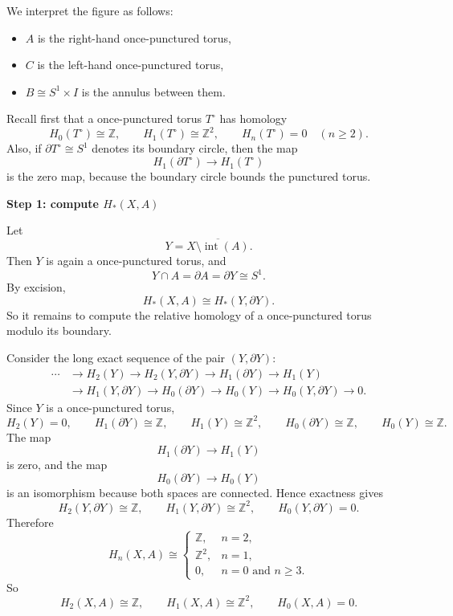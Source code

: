 \begin{solution}
We interpret the figure as follows:

\begin{itemize}
	\item \(A\) is the right-hand once-punctured torus,
	\item \(C\) is the left-hand once-punctured torus,
	\item \(B\cong S^1\times I\) is the annulus between them.
\end{itemize}

Recall first that a once-punctured torus \(T^\circ\) has homology
\[
H_0(T^\circ)\cong \mathbb Z,\qquad
H_1(T^\circ)\cong \mathbb Z^2,\qquad
H_n(T^\circ)=0\quad(n\ge 2).
\]
Also, if \(\partial T^\circ\cong S^1\) denotes its boundary circle, then the map
\[
H_1(\partial T^\circ)\to H_1(T^\circ)
\]
is the zero map, because the boundary circle bounds the punctured torus.


\medskip
\noindent\textbf{Step 1: compute \(H_*(X,A)\)}\par
\smallskip


Let
\[
Y=\overline{X\setminus \operatorname{int}(A)}.
\]
Then \(Y\) is again a once-punctured torus, and
\[
Y\cap A=\partial A=\partial Y\cong S^1.
\]
By excision,
\[
H_*(X,A)\cong H_*(Y,\partial Y).
\]
So it remains to compute the relative homology of a once-punctured torus modulo its boundary.

Consider the long exact sequence of the pair \((Y,\partial Y)\):
\[
\begin{aligned}
\cdots&\to H_2(Y)\to H_2(Y,\partial Y)
\to H_1(\partial Y)\to H_1(Y)\\
&\to H_1(Y,\partial Y)\to H_0(\partial Y)
\to H_0(Y)\to H_0(Y,\partial Y)\to 0.
\end{aligned}
\]
Since \(Y\) is a once-punctured torus,
\[
H_2(Y)=0,\qquad
H_1(\partial Y)\cong \mathbb Z,\qquad
H_1(Y)\cong \mathbb Z^2,\qquad
H_0(\partial Y)\cong \mathbb Z,\qquad
H_0(Y)\cong \mathbb Z.
\]
The map
\[
H_1(\partial Y)\to H_1(Y)
\]
is zero, and the map
\[
H_0(\partial Y)\to H_0(Y)
\]
is an isomorphism because both spaces are connected. Hence exactness gives
\[
H_2(Y,\partial Y)\cong \mathbb Z,
\qquad
H_1(Y,\partial Y)\cong \mathbb Z^2,
\qquad
H_0(Y,\partial Y)=0.
\]
Therefore
\[
H_n(X,A)\cong
\begin{cases}
	\mathbb Z, & n=2,\\[1mm]
	\mathbb Z^2, & n=1,\\[1mm]
	0, & n=0\text{ and }n\ge 3.
\end{cases}
\]
So
\[
\boxed{
	H_2(X,A)\cong \mathbb Z,\qquad
	H_1(X,A)\cong \mathbb Z^2,\qquad
	H_0(X,A)=0.
}
\]



\end{solution}
